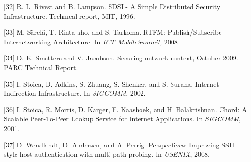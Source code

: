 [32] R. L. Rivest and B. Lampson. SDSI - A Simple Distributed
Security Infrastructure. Technical report, MIT, 1996.

[33] M. Särelä, T. Rinta-aho, and S. Tarkoma. RTFM:
Publish/Subscribe Internetworking Architecture. In
\emph{ICT-MobileSummit}, 2008.

[34] D. K. Smetters and V. Jacobson. Securing network content,
October 2009. PARC Technical Report.

[35] I. Stoica, D. Adkins, S. Zhuang, S. Shenker, and S. Surana.
Internet Indirection Infrastructure. In \emph{SIGCOMM}, 2002.

[36] I. Stoica, R. Morris, D. Karger, F. Kaashoek, and
H. Balakrishnan. Chord: A Scalable Peer-To-Peer Lookup
Service for Internet Applications. In \emph{SIGCOMM}, 2001.

[37] D. Wendlandt, D. Andersen, and A. Perrig. Perspectives: Improving SSH-style host authentication with multi-path
probing. In \emph{USENIX}, 2008.